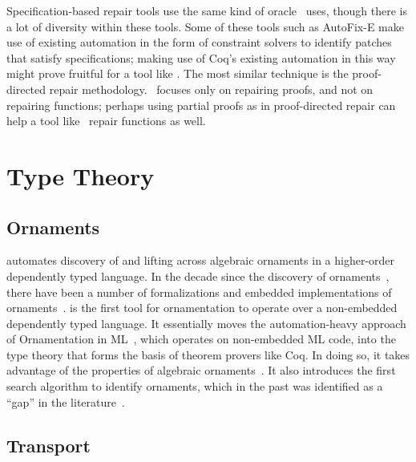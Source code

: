 
Specification-based repair tools use
the same kind of oracle \sysname\ uses,
though there is a lot of diversity
within these tools. %
Some of these tools such as AutoFix-E make
use of existing automation in the form of constraint
solvers to identify patches that satisfy specifications;
making use of Coq's existing automation
in this way might prove fruitful for a tool like \sysname.
The most similar technique is the proof-directed repair methodology. 
\sysname\ focuses
only on repairing proofs, and not
on repairing functions; perhaps using partial 
proofs as in proof-directed repair
can help a tool like \sysname\
repair functions as well.

\section{Type Theory}

\subsection{Ornaments}


\toolnameb automates discovery of and lifting across algebraic ornaments in a higher-order dependently typed language.
In the decade since the discovery of ornaments~\cite{mcbride}, there have been a number
of formalizations and embedded implementations of ornaments~\cite{Dagand:2013:CTO:2591370.2591396, ko2013relational, dagand2014transporting, ko2016programming, dagand2017essence}.
\toolnameb is the first tool for ornamentation to operate over a non-embedded dependently typed language.
It essentially moves the automation-heavy approach of Ornamentation in ML~\cite{Williams2017},
which operates on non-embedded ML code, into the type theory that forms the basis of theorem provers like Coq. 
In doing so, it takes advantage of the properties of algebraic ornaments~\cite{mcbride}.
It also introduces the first search algorithm to identify ornaments, which in the past 
was identified as a ``gap'' in the literature~\cite{ko2016programming}.

\subsection{Transport}

